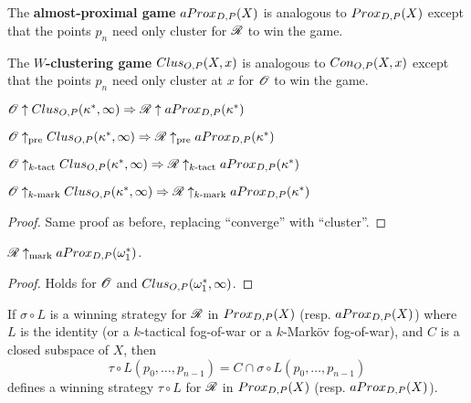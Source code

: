 \begin{definition}
  The \textbf{almost-proximal game} $aProx_{D,P}(X)$ is analogous to $Prox_{D,P}(X)$ except that the points $p_n$ need only cluster for $\mathscr{R}$ to win the game.
\end{definition}

\begin{definition}
  The \textbf{$W$-clustering game} $Clus_{O,P}(X,x)$ is analogous to $Con_{O,P}(X,x)$ except that the points $p_n$ need only cluster at $x$ for $\mathscr{O}$ to win the game.
\end{definition}

\begin{proposition}
$\mathscr{O}\uparrow Clus_{O,P}(\kappa^*,\infty) \Rightarrow \mathscr{R} \uparrow aProx_{D,P}(\kappa^*)$

$\mathscr{O}\uparrow_{\text{pre}} Clus_{O,P}(\kappa^*,\infty) \Rightarrow \mathscr{R} \uparrow_{\text{pre}} aProx_{D,P}(\kappa^*)$

$\mathscr{O}\uparrow_{k\text{-tact}} Clus_{O,P}(\kappa^*,\infty) \Rightarrow \mathscr{R} \uparrow_{k\text{-tact}} aProx_{D,P}(\kappa^*)$

$\mathscr{O}\uparrow_{k\text{-mark}} Clus_{O,P}(\kappa^*,\infty) \Rightarrow \mathscr{R} \uparrow_{k\text{-mark}} aProx_{D,P}(\kappa^*)$
\end{proposition}

\begin{proof}
  Same proof as before, replacing ``converge'' with ``cluster''.
\end{proof}

\begin{corollary}
$\mathscr{R}\uparrow_{\text{mark}} aProx_{D,P}(\omega_1^*)$.
\end{corollary}

\begin{proof}
Holds for $\mathscr{O}$ and $Clus_{O,P}(\omega_1^*,\infty)$.
\end{proof}

\begin{proposition}
If $\sigma\circ L$ is a winning strategy for $\mathscr{R}$ in $Prox_{D,P}(X)$ (resp. $aProx_{D,P}(X)$) where $L$ is the identity (or a $k$-tactical fog-of-war or a $k$-Mark\"ov fog-of-war), and $C$ is a closed subspace of $X$, then
  \[
    \tau\circ L(p_0,\dots,p_{n-1}) = C\cap \sigma\circ L(p_0,\dots,p_{n-1})
  \]
defines a winning strategy $\tau\circ L$ for $\mathscr{R}$ in $Prox_{D,P}(X)$ (resp. $aProx_{D,P}(X)$).
\end{proposition}

